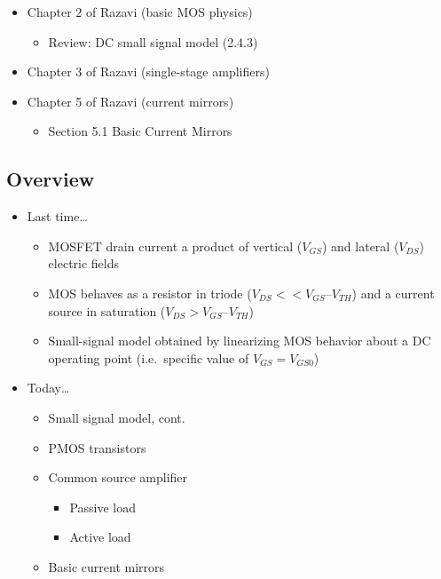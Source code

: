 \documentclass[11pt]{article}
\providecommand{\tightlist}{%
      \setlength{\itemsep}{0pt}\setlength{\parskip}{0pt}}
\begin{document}
    \begin{itemize}
\tightlist
\item
  Chapter 2 of Razavi (basic MOS physics)

  \begin{itemize}
  \tightlist
  \item
    Review: DC small signal model (2.4.3)
  \end{itemize}
\item
  Chapter 3 of Razavi (single-stage amplifiers)
\item
  Chapter 5 of Razavi (current mirrors)

  \begin{itemize}
  \tightlist
  \item
    Section 5.1 Basic Current Mirrors
  \end{itemize}
\end{itemize}

    \hypertarget{overview}{%
\subsection{Overview}\label{overview}}

    \begin{itemize}
\tightlist
\item
  Last time\ldots{}

  \begin{itemize}
  \tightlist
  \item
    MOSFET drain current a product of vertical (\(V_{GS}\)) and lateral
    (\(V_{DS}\)) electric fields
  \item
    MOS behaves as a resistor in triode (\(V_{DS} << V_{GS} – V_{TH}\))
    and a current source in saturation (\(V_{DS} > V_{GS} – V_{TH}\))
  \item
    Small-signal model obtained by linearizing MOS behavior about a DC
    operating point (i.e.~specific value of \(V_{GS} = V_{GS0}\))
  \end{itemize}
\item
  Today\ldots{}

  \begin{itemize}
  \tightlist
  \item
    Small signal model, cont.
  \item
    PMOS transistors
  \item
    Common source amplifier

    \begin{itemize}
    \tightlist
    \item
      Passive load
    \item
      Active load
    \end{itemize}
  \item
    Basic current mirrors
  \end{itemize}
\end{itemize}
\end{document}

